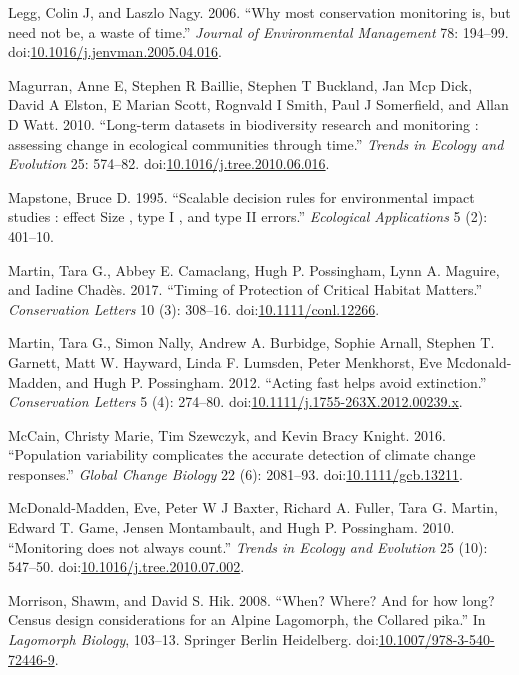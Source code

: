 \documentclass[12pt,]{article}
\begin{document}
\hypertarget{ref-Legg2006}{}
Legg, Colin J, and Laszlo Nagy. 2006. ``Why most conservation monitoring
is, but need not be, a waste of time.'' \emph{Journal of Environmental
Management} 78: 194--99.
doi:\href{https://doi.org/10.1016/j.jenvman.2005.04.016}{10.1016/j.jenvman.2005.04.016}.

\hypertarget{ref-Magurran2010}{}
Magurran, Anne E, Stephen R Baillie, Stephen T Buckland, Jan Mcp Dick,
David A Elston, E Marian Scott, Rognvald I Smith, Paul J Somerfield, and
Allan D Watt. 2010. ``Long-term datasets in biodiversity research and
monitoring : assessing change in ecological communities through time.''
\emph{Trends in Ecology and Evolution} 25: 574--82.
doi:\href{https://doi.org/10.1016/j.tree.2010.06.016}{10.1016/j.tree.2010.06.016}.

\hypertarget{ref-Mapstone1995}{}
Mapstone, Bruce D. 1995. ``Scalable decision rules for environmental
impact studies : effect Size , type I , and type II errors.''
\emph{Ecological Applications} 5 (2): 401--10.

\hypertarget{ref-Martin2017}{}
Martin, Tara G., Abbey E. Camaclang, Hugh P. Possingham, Lynn A.
Maguire, and Iadine Chadès. 2017. ``Timing of Protection of Critical
Habitat Matters.'' \emph{Conservation Letters} 10 (3): 308--16.
doi:\href{https://doi.org/10.1111/conl.12266}{10.1111/conl.12266}.

\hypertarget{ref-Martin2012}{}
Martin, Tara G., Simon Nally, Andrew A. Burbidge, Sophie Arnall, Stephen
T. Garnett, Matt W. Hayward, Linda F. Lumsden, Peter Menkhorst, Eve
Mcdonald-Madden, and Hugh P. Possingham. 2012. ``Acting fast helps avoid
extinction.'' \emph{Conservation Letters} 5 (4): 274--80.
doi:\href{https://doi.org/10.1111/j.1755-263X.2012.00239.x}{10.1111/j.1755-263X.2012.00239.x}.

\hypertarget{ref-McCain2016}{}
McCain, Christy Marie, Tim Szewczyk, and Kevin Bracy Knight. 2016.
``Population variability complicates the accurate detection of climate
change responses.'' \emph{Global Change Biology} 22 (6): 2081--93.
doi:\href{https://doi.org/10.1111/gcb.13211}{10.1111/gcb.13211}.

\hypertarget{ref-McDonald-Madden2010}{}
McDonald-Madden, Eve, Peter W J Baxter, Richard A. Fuller, Tara G.
Martin, Edward T. Game, Jensen Montambault, and Hugh P. Possingham.
2010. ``Monitoring does not always count.'' \emph{Trends in Ecology and
Evolution} 25 (10): 547--50.
doi:\href{https://doi.org/10.1016/j.tree.2010.07.002}{10.1016/j.tree.2010.07.002}.

\hypertarget{ref-Morrison2008}{}
Morrison, Shawm, and David S. Hik. 2008. ``When? Where? And for how
long? Census design considerations for an Alpine Lagomorph, the Collared
pika.'' In \emph{Lagomorph Biology}, 103--13. Springer Berlin
Heidelberg.
doi:\href{https://doi.org/10.1007/978-3-540-72446-9}{10.1007/978-3-540-72446-9}.
\end{document}
